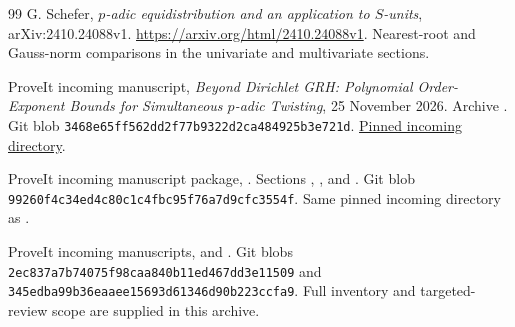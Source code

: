 \begin{thebibliography}{99}
G. Schefer, \emph{\(p\)-adic equidistribution and an application to
\(S\)-units}, arXiv:2410.24088v1.
\url{https://arxiv.org/html/2410.24088v1}.
Nearest-root and Gauss-norm comparisons in the univariate and
multivariate sections.

ProveIt incoming manuscript,
\emph{Beyond Dirichlet GRH: Polynomial Order-Exponent Bounds for
Simultaneous \(p\)-adic Twisting}, 25 November 2026.
Archive .
Git blob \texttt{3468e65ff562dd2f77b9322d2ca484925b3e721d}.
\href{https://github.com/VladimirReshetnikov/ProveIt/tree/6fe2c1bd450aa7f19eab17fb9a6e76170b4fce00/docs/incoming}{Pinned incoming directory}.

ProveIt incoming manuscript package,
.
Sections , ,
and .
Git blob \texttt{99260f4c34ed4c80c1c4fbc95f76a7d9cfc3554f}.
Same pinned incoming directory as \cite{priorquant}.

ProveIt incoming manuscripts,
 and
.
Git blobs \texttt{2ec837a7b74075f98caa840b11ed467dd3e11509}
and \texttt{345edba99b36eaaee15693d61346d90b223ccfa9}.
Full inventory and targeted-review scope are supplied in this archive.
\end{thebibliography}

